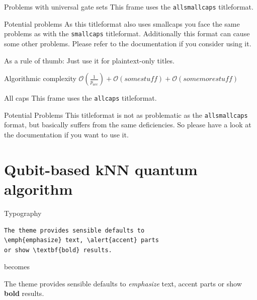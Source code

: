 \documentclass[10pt]{beamer}
\begin{document}
{
\begin{frame}{Problems with universal gate sets}
	This frame uses the \texttt{allsmallcaps} titleformat.

	\begin{alertblock}{Potential problems}
		As this titleformat also uses smallcaps you face the same problems as with the \texttt{smallcaps} titleformat. Additionally this format can cause some other problems. Please refer to the documentation if you consider using it.
\end{alertblock}

		As a rule of thumb: Just use it for plaintext-only titles.
	\begin{alertblock}{Algorithmic complexity}
	$\mathcal{O}(\frac{1}{p_{acc}})+\mathcal{O}(somestuff)+\mathcal{O}(somemorestuff)$
	\end{alertblock}
\end{frame}
}
{
\begin{frame}{All caps}
	This frame uses the \texttt{allcaps} titleformat.

	\begin{alertblock}{Potential Problems}
		This titleformat is not as problematic as the \texttt{allsmallcaps} format, but basically suffers from the same deficiencies. So please have a look at the documentation if you want to use it.
	\end{alertblock}
\end{frame}
}

\section{Qubit-based kNN quantum algorithm}

{
\begin{frame}[fragile]{Typography}
      \begin{verbatim}The theme provides sensible defaults to
\emph{emphasize} text, \alert{accent} parts
or show \textbf{bold} results.\end{verbatim}

  \begin{center}becomes\end{center}

  The theme provides sensible defaults to \emph{emphasize} text,
  \alert{accent} parts or show \textbf{bold} results.
\end{frame}
}
\end{document}
